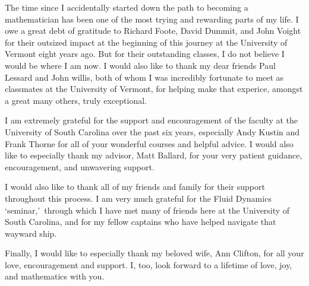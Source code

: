 The time since I accidentally started down the path to becoming a mathematician has been one of the most trying and rewarding parts of my life.
I owe a great debt of gratitude to Richard Foote, David Dummit, and John Voight for their outsized impact at the beginning of this journey at the University of Vermont eight years ago.
But for their outstanding classes, I do not believe I would be where I am now.
I would also like to thank my dear friends Paul Lessard and John willis, both of whom I was incredibly fortunate to meet as classmates at the University of Vermont, for helping make that experice, amongst a great many others, truly exceptional.

I am extremely grateful for the support and encouragement of the faculty at the University of South Carolina over the past six years, especially Andy Kustin and Frank Thorne for all of your wonderful courses and helpful advice.
I would also like to especially thank my advisor, Matt Ballard, for your very patient guidance, encouragement, and unwavering support.

I would also like to thank all of my friends and family for their support throughout this process.
I am very much grateful for the Fluid Dynamics \lq seminar,\rq\, through which I have met many of friends here at the University of South Carolina, and for my fellow captains who have helped navigate that wayward ship.

Finally, I would like to especially thank my beloved wife, Ann Clifton, for all your love, encouragement and support.
I, too, look forward to a lifetime of love, joy, and mathematics with you.
